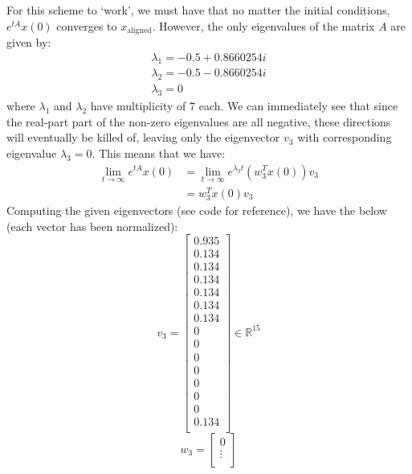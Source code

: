 \documentclass[12pt]{exam}
\begin{document}
\begin{questions}
\begin{solution}
\begin{enumerate}[label=(\alph*)]
\begin{itemize}
          For this scheme to `work', we must have that no matter the initial conditions, $e^{tA}x(0)$ converges to $x_{\text{aligned}}$. However, the only eigenvalues of the matrix $A$ are given by:
          \begin{align*}
            \lambda_1 = -0.5+0.8660254i \\
            \lambda_2 = -0.5-0.8660254i \\
            \lambda_3 = 0
          \end{align*}
          where $\lambda_1$ and $\lambda_2$ have multiplicity of $7$ each. We can immediately see that since the real-part part of the non-zero eigenvalues are all negative, these directions will eventually be killed of, leaving only the eigenvector $v_3$ with corresponding eigenvalue $\lambda_3 = 0$. This means that we have:
          \begin{align*}
            \lim_{t \to \infty} e^{tA}x(0) &= \lim_{t \to \infty} e^{\lambda_3 t}(w_3^Tx(0))v_3 \\
            &= w_3^Tx(0)v_3
          \end{align*}
          Computing the given eigenvectors (see code for reference), we have the below (each vector has been normalized):
          \[
            v_3 =
              \begin{bmatrix}
                0.935 \\
                0.134 \\
                0.134 \\
                0.134 \\
                0.134 \\
                0.134 \\
                0.134 \\
                0 \\
                0 \\
                0 \\
                0 \\
                0 \\
                0 \\
                0 \\
                0.134 \\
              \end{bmatrix} \in \mathbb{R}^{15}
          \]
          \[
            w_3 =
              \begin{bmatrix}
                0 \\
                \vdots \\

\end{bmatrix}\]
\end{itemize}
\end{enumerate}
\end{solution}
\end{questions}
\end{document}
